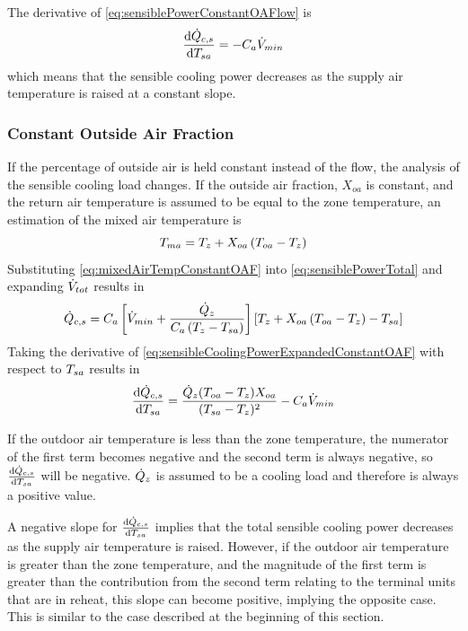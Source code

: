 The derivative of  \ref{eq:sensiblePowerConstantOAFlow} is
\begin{equation}
    \dv{\dot{Q}_{c,s}}{T_{sa}{}} = -C_{a} \dot{V}_{min} 
\end{equation}
which means that the sensible cooling power decreases as the supply air
temperature is raised at a constant slope. 


\subsubsection{Constant Outside Air Fraction}

If the percentage of outside air is held constant instead of the flow,
the analysis of the sensible cooling load changes. If the outside air
fraction, \(X_{oa}\) is constant, and the return air temperature is assumed to be
equal to the zone temperature, an estimation of the mixed air temperature is
\begin{equation}\label{eq:mixedAirTempConstantOAF}
    T_{ma}{} = T_{z} + X_{oa} \left(T_{oa}{} - T_{z}\right)
\end{equation}
Substituting  \ref{eq:mixedAirTempConstantOAF} into
\ref{eq:sensiblePowerTotal} and expanding \(\dot{V}_{tot}\) results in
\begin{equation}\label{eq:sensibleCoolingPowerExpandedConstantOAF}
    \dot{Q}_{c,s} = C_{a} \left[ \dot{V}_{min} + \frac{\dot{Q}_{z}}{C_{a}\left(T_{z}-T_{sa}{}\right)}{} \right] \left[ T_{z} + X_{oa} \left(T_{oa}{} - T_{z}\right) - T_{sa}{}  \right]
\end{equation}
Taking the derivative of 
\ref{eq:sensibleCoolingPowerExpandedConstantOAF} with respect to
\(T_{sa}{}\) results in
\begin{equation}\label{eq:firstDerivativeSensible}
    \dv{\dot{Q}_{c,s}}{T_{sa}{}} = \frac{\dot{Q}_{z} (T_{oa}{}-T_{z})
    X_{oa}}{(T_{sa}{}-T_{z})^2}-C_{a} \dot{V}_{min}
\end{equation}

If the outdoor air temperature is less than the zone temperature, the
numerator of the first term becomes negative and the second term is
always negative, so \(\dv{\dot{Q}_{c,s}}{T_{sa}{}}\) will be negative.
\(\dot{Q}_{z}\) is assumed to be a cooling load and therefore is
always a positive value. 

A negative slope for \(\dv{\dot{Q}_{c,s}}{T_{sa}{}}\) implies that the
total sensible cooling power decreases as the supply air temperature is
raised. However, if the outdoor air temperature is greater than the zone
temperature, and the magnitude of the first term is greater than the
contribution from the second term relating to the terminal units that
are in reheat, this slope can become positive, implying the opposite
case. This is similar to the case described at the beginning of this
section. 

